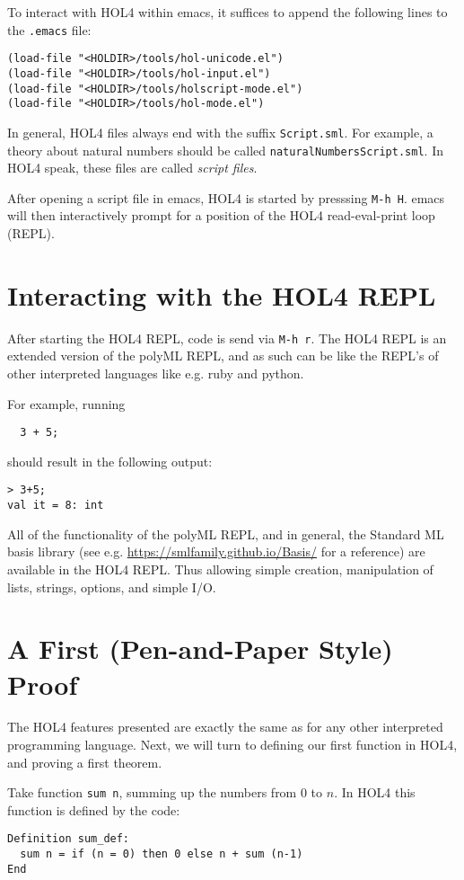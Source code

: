 \documentclass[10pt]{scrartcl}
\newcommand{\ekey}[1]{\texttt{#1}}
\begin{document}
To interact with HOL4 within emacs, it suffices to append the following lines to
the \texttt{.emacs} file:
\begin{lstlisting}
(load-file "<HOLDIR>/tools/hol-unicode.el")
(load-file "<HOLDIR>/tools/hol-input.el")
(load-file "<HOLDIR>/tools/holscript-mode.el")
(load-file "<HOLDIR>/tools/hol-mode.el")
\end{lstlisting}

In general, HOL4 files always end with the suffix \verb!Script.sml!.
For example, a theory about natural numbers should be called
\verb!naturalNumbersScript.sml!.
In HOL4 speak, these files are called \emph{script files}.

After opening a script file in emacs, HOL4 is started by presssing
\ekey{M-h H}.
emacs will then interactively prompt for a position of the HOL4
read-eval-print loop (REPL).

\section{Interacting with the HOL4 REPL}

After starting the HOL4 REPL, code is send via \ekey{M-h r}.
The HOL4 REPL is an extended version of the polyML REPL, and as such can be like
the REPL's of other interpreted languages like e.g. ruby and python.

For example, running
\begin{lstlisting}
  3 + 5;
\end{lstlisting}

should result in the following output:
\begin{lstlisting}
> 3+5;
val it = 8: int
\end{lstlisting}

All of the functionality of the polyML REPL, and in general, the Standard ML
basis library (see e.g. \url{https://smlfamily.github.io/Basis/} for a reference)
are available in the HOL4 REPL.
Thus allowing simple creation, manipulation of lists, strings, options, and
simple I/O.

\section{A First (Pen-and-Paper Style) Proof}
%
The HOL4 features presented are exactly the same as for any other interpreted
programming language.
Next, we will turn to defining our first function in HOL4, and proving a first
theorem.

Take function \verb!sum n!, summing up the numbers from $0$ to $n$.
In HOL4 this function is defined by the code:
\begin{lstlisting}
Definition sum_def:
  sum n = if (n = 0) then 0 else n + sum (n-1)
End
\end{lstlisting}
\end{document}
